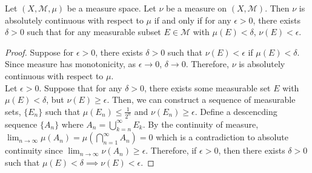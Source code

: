 \begin{theorem}
	Let $(X,\mathcal{M},\mu)$ be a measure space.
	Let $\nu$ be a measure on $(X,\mathcal{M})$.
	Then $\nu$ is absolutely continuous with respect to $\mu$ if and only if for any $\epsilon > 0$, there exists $\delta > 0$ such that for any measurable subset $E \in \mathcal{M}$ with $\mu(E) < \delta$, $\nu(E) < \epsilon$.
\end{theorem}
\begin{proof}
	Suppose for $\epsilon > 0$, there exists $\delta > 0$ such that $\nu(E) < \epsilon$ if $\mu(E) < \delta$.
	Since measure has monotonicity, as $\epsilon \to 0$, $\delta \to 0$.
	Therefore, $\nu$ is absolutely continuous with respect to $\mu$.\\

	Let $\epsilon > 0$.
	Suppose that for any $\delta > 0$, there exists some measurable set $E$ with $\mu(E) < \delta$, but $\nu(E) \ge \epsilon$.
	Then, we can construct a sequence of measurable sets, $\{ E_n \}$ such that $\mu(E_n) \le \frac{1}{2^n}$ and $\nu(E_n) \ge \epsilon$.
	Define a descencding sequence $\{ A_n \}$ where $\displaystyle A_n = \bigcup_{k = n}^\infty E_k$.
	By the continuity of measure, $\displaystyle \lim_{n \to \infty} \mu (A_n) = \mu \left( \bigcap_{n = 1}^\infty A_n \right) = 0$ which is a contradiction to absolute continuity since $\displaystyle \lim_{n \to \infty} \nu(A_n) \ge \epsilon$.
	Therefore, if $\epsilon > 0$, then there exists $\delta > 0$ such that $\mu(E) < \delta \implies \nu(E) < \epsilon$.
\end{proof}

